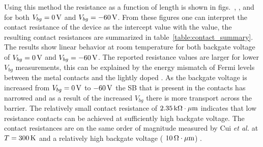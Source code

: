 Using this method the resistance as a function of length is shown in figs.~, , and  for both $V_{bg}=0\,\mathrm{V}$ and $V_{bg}=-60\,\mathrm{V}$. From these figures one can interpret the contact resistance of the device as the intercept value with the value, the resulting contact resistances are summarized in table~\ref{table:contact_summary}. The results show linear behavior at room temperature for both backgate voltage of $V_{bg}=0\,\mathrm{V}$ and $V_{bg}=-60\,\mathrm{V}$. The reported resistance values are larger for lower $V_{bg}$ measurements, this can be explained by the energy mismatch of Fermi levels between the metal contacts and the lightly doped . As the backgate voltage is increased from $V_{bg} = 0\,\mathrm{V}$ to $-60\,\mathrm{V}$ the \acs{SB} that is present in the contacts has narrowed and as a result of the increased $V_{bg}$ there is more transport across the barrier. The relatively small contact resistance of $2.35\,\mathrm{k\Omega\cdot\mu m}$ indicates that low resistance contacts can be achieved at sufficiently high backgate voltage. The contact resistances are on the same order of magnitude measured by Cui \emph{et al.} at $T=300\,\mathrm{K}$ and a relatively high backgate voltage ($~10\,\mathrm{\Omega\cdot\mu m}$) \cite{Cui_NatureNano2015}.  \\ \\


